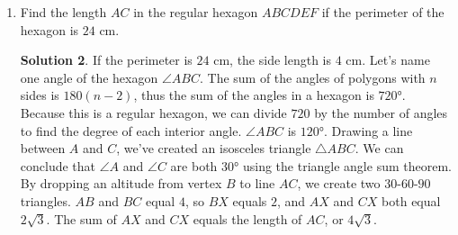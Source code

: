 \documentclass{article}
\theoremstyle{definition}
\newtheorem*{solution}{Solution}
\begin{document}
\begin{multicols}{2}
\begin{enumerate}
\begin{solution}
                Since the triangle is isosceles, the altitude $AX$ to side $BC$ bisects $BC$.
                Thus, from the Pythagorean Theorem on the right triangle $ABX$, we find $AX = 30$, so $ABC = \frac{BC \cdot AX}{2} = \frac{80 \cdot 30}{2} = 1200$ squared units.
            \end{solution}
            \item Find the length $AC$ in the regular hexagon $ABCDEF$ if the perimeter of the hexagon is $24$ cm.
            \begin{solution}
                If the perimeter is $24$ cm, the side length is $4$ cm.
                Let's name one angle of the hexagon $\angle ABC$.
                The sum of the angles of polygons with $n$ sides is $180(n - 2)$, thus the sum of the angles in a hexagon is $\ang{720}$.
                Because this is a regular hexagon, we can divide $720$ by the number of angles to find the degree of each interior angle.
                $\angle ABC$ is $\ang{120}$.
                Drawing a line between $A$ and $C$, we've created an isosceles triangle $\triangle ABC$.
                We can conclude that $\angle A$ and $\angle C$ are both $\ang{30}$ using the triangle angle sum theorem.
                By dropping an altitude from vertex $B$ to line $AC$, we create two $30$-$60$-$90$ triangles.
                $AB$ and $BC$ equal $4$, so $BX$ equals $2$, and $AX$ and $CX$ both equal $2\sqrt{3}$.
                The sum of $AX$ and $CX$ equals the length of $AC$, or $4\sqrt{3}$.
            \end{solution}
    \end{enumerate}
\end{multicols}
\end{document}
